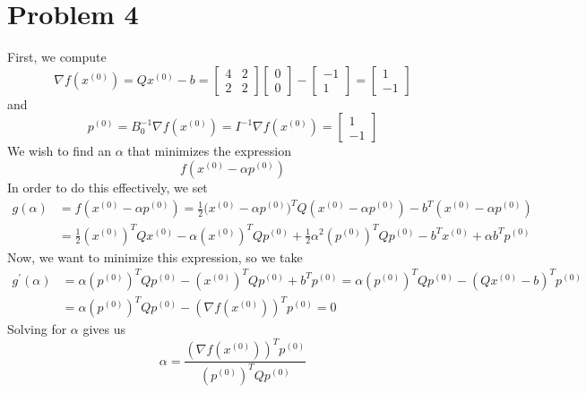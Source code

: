 \documentclass[12pt]{article}
\begin{document}
\section*{Problem 4}
First, we compute 
\[
\nabla f(x^{(0)}) = Qx^{(0)} - b =
\begin{bmatrix}
4 & 2\\
2 & 2
\end{bmatrix}
\begin{bmatrix}
0\\
0
\end{bmatrix} -
\begin{bmatrix}
-1\\
1
\end{bmatrix}=
\begin{bmatrix}
1\\
-1
\end{bmatrix}
\] and
\[
p^{(0)} =  B_0^{-1} \nabla f(x^{(0)}) = I^{-1} \nabla f(x^{(0)}) = \begin{bmatrix}
1\\
-1
\end{bmatrix} 
\] We wish to find an $\alpha$ that minimizes the expression
\[
f(x^{(0)} - \alpha p^{(0)})
\]  In order to do this effectively, we set
\begin{align*}
g(\alpha) & = f(x^{(0)} - \alpha p^{(0)}) = \frac{1}{2} \big(x^{(0)} - \alpha p^{(0)}\big)^T Q (x^{(0)} - \alpha p^{(0)}) - b^T(x^{(0)} - \alpha p^{(0)})\\
& = \frac{1}{2}(x^{(0)})^T Q x^{(0)} - \alpha (x^{(0)})^T Q p^{(0)} + \frac{1}{2}\alpha^2 (p^{(0)})^T Q p^{(0)} - b^T x^{(0)} + \alpha b^T p^{(0)}
\end{align*}
Now, we want to minimize this expression, so we take
\begin{align*}
g^\prime(\alpha) &= \alpha (p^{(0)})^T Q p^{(0)} - (x^{(0)})^T Q p^{(0)} + b^T p^{(0)} = \alpha (p^{(0)})^T Q p^{(0)} - (Qx^{(0)} - b)^T p^{(0)}\\
&=  \alpha (p^{(0)})^T Q p^{(0)} - (\nabla f(x^{(0)}))^T p^{(0)} = 0
\end{align*} Solving for $\alpha$ gives us
\[
\alpha = \frac{(\nabla f(x^{(0)}))^Tp^{(0)}}{(p^{(0)})^TQp^{(0)}}
\]
\end{document}
